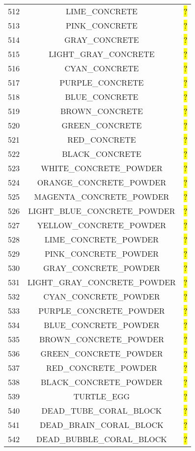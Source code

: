 \documentclass[11pt]{article}
\newcommand\myworries[1]{\sethlcolor{red}\hl{#1}}
\begin{document}
\begin{longtable}{ |c|c|c| }
512 & LIME\_CONCRETE & \myworries{?} \\
513 & PINK\_CONCRETE & \myworries{?} \\
514 & GRAY\_CONCRETE & \myworries{?} \\
515 & LIGHT\_GRAY\_CONCRETE & \myworries{?} \\
516 & CYAN\_CONCRETE & \myworries{?} \\
517 & PURPLE\_CONCRETE & \myworries{?} \\
518 & BLUE\_CONCRETE & \myworries{?} \\
519 & BROWN\_CONCRETE & \myworries{?} \\
520 & GREEN\_CONCRETE & \myworries{?} \\
521 & RED\_CONCRETE & \myworries{?} \\
522 & BLACK\_CONCRETE & \myworries{?} \\
523 & WHITE\_CONCRETE\_POWDER & \myworries{?} \\
524 & ORANGE\_CONCRETE\_POWDER & \myworries{?} \\
525 & MAGENTA\_CONCRETE\_POWDER & \myworries{?} \\
526 & LIGHT\_BLUE\_CONCRETE\_POWDER & \myworries{?} \\
527 & YELLOW\_CONCRETE\_POWDER & \myworries{?} \\
528 & LIME\_CONCRETE\_POWDER & \myworries{?} \\
529 & PINK\_CONCRETE\_POWDER & \myworries{?} \\
530 & GRAY\_CONCRETE\_POWDER & \myworries{?} \\
531 & LIGHT\_GRAY\_CONCRETE\_POWDER & \myworries{?} \\
532 & CYAN\_CONCRETE\_POWDER & \myworries{?} \\
533 & PURPLE\_CONCRETE\_POWDER & \myworries{?} \\
534 & BLUE\_CONCRETE\_POWDER & \myworries{?} \\
535 & BROWN\_CONCRETE\_POWDER & \myworries{?} \\
536 & GREEN\_CONCRETE\_POWDER & \myworries{?} \\
537 & RED\_CONCRETE\_POWDER & \myworries{?} \\
538 & BLACK\_CONCRETE\_POWDER & \myworries{?} \\
539 & TURTLE\_EGG & \myworries{?} \\
540 & DEAD\_TUBE\_CORAL\_BLOCK & \myworries{?} \\
541 & DEAD\_BRAIN\_CORAL\_BLOCK & \myworries{?} \\
542 & DEAD\_BUBBLE\_CORAL\_BLOCK & \myworries{?} \\

\end{longtable}
\end{document}
